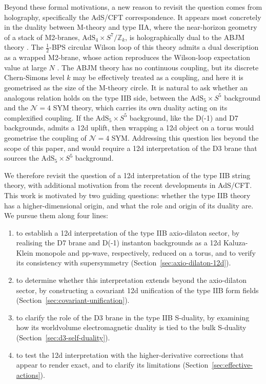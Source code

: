 Beyond these formal motivations, a new reason to revisit the question comes from holography, specifically the AdS/CFT correspondence.
It appears most concretely in the duality between M-theory and type IIA, where the near-horizon geometry of a stack of M2-branes, $\mathrm{AdS}_4 \times S^7/\mathbb{Z}_k$, is holographically dual to the ABJM theory \cite{Aharony:2008ug}.
The $\tfrac{1}{2}$-BPS circular Wilson loop of this theory admits a dual description as a wrapped M2-brane, whose action reproduces the Wilson-loop expectation value at large $N$ \cite{Giombi:2023vzu,Tseytlin:2024euk}.
The ABJM theory has no continuous coupling, but its discrete Chern-Simons level $k$ may be effectively treated as a coupling, and here it is geometrised as the size of the M-theory circle.
It is natural to ask whether an analogous relation holds on the type IIB side, between the $\mathrm{AdS}_5 \times S^5$ background and the $\mathcal{N}=4$ SYM theory, which carries its own \SLZ{} duality acting on its complexified coupling.
If the $\mathrm{AdS}_5 \times S^5$ background, like the D(-1) and D7 backgrounds, admits a 12d uplift, then wrapping a 12d object on a torus would geometrise the coupling of $\mathcal{N}=4$ SYM.
Addressing this question lies beyond the scope of this paper, and would require a 12d interpretation of the D3 brane that sources the $\mathrm{AdS}_5 \times S^5$ background.

We therefore revisit the question of a 12d interpretation of the type IIB string theory, with additional motivation from the recent developments in AdS/CFT.
This work is motivated by two guiding questions: whether the type IIB theory has a higher-dimensional origin, and what the role and origin of its \SLZ{} duality are.
We pursue them along four lines:
\begin{enumerate}
    \item to establish a 12d interpretation of the type IIB axio-dilaton sector, by realising the D7 brane and D(-1) instanton backgrounds as a 12d Kaluza-Klein monopole and pp-wave, respectively, reduced on a torus, and to verify its consistency with supersymmetry (Section~\ref{sec:axio-dilaton-12d}).
    \item to determine whether this interpretation extends beyond the axio-dilaton sector, by constructing a covariant 12d unification of the type IIB form fields (Section~\ref{sec:covariant-unification}).
    \item to clarify the role of the D3 brane in the type IIB S-duality, by examining how its worldvolume electromagnetic duality is tied to the bulk \SLZ{} S-duality (Section~\ref{sec:d3-self-duality}).
    \item to test the 12d interpretation with the higher-derivative corrections that appear to render \SLZ{} exact, and to clarify its limitations (Section~\ref{sec:effective-actions}).
\end{enumerate}


